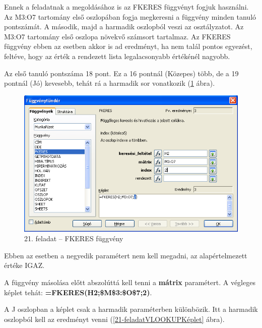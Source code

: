 Ennek a feladatnak a megoldásához is az FKERES függvényt fogjuk
használni. Az M3:O7 tartomány első oszlopában fogja
megkeresni a függvény minden tanuló pontszámát. A második,
majd a harmadik oszlopból veszi az osztályzatot. Az M3:O7
tartomány első oszlopa növekvő számsort tartalmaz. Az
FKERES függvény ebben az esetben akkor is ad eredményt, ha nem
talál pontos egyezést, feltéve, hogy az érték a rendezett
lista legalacsonyabb értékénél nagyobb.

Az első tanuló pontszáma 18 pont. Ez a 16 pontnál (Közepes)
több, de a 19 pontnál (Jó) kevesebb, tehát rá a harmadik sor
vonatkozik (\ref{21-feladatVLOOKUP} ábra).

\begin{figure}[!h]
\begin{center}
\includegraphics[width=13.999cm]{oocalcv2-img98.png}
\caption{21. feladat --  FKERES függvény}\label{21-feladatVLOOKUP}
\end{center}
\end{figure}

Ebben az esetben a negyedik paramétert nem kell megadni, az
alapértelmezett értéke IGAZ.

A függvény másolása előtt abszolúttá kell tenni a
\textbf{mátrix} paramétert. A végleges képlet tehát:
\textsf{\textbf{=FKERES(H2;\$M\$3:\$O\$7;2)}}.

A J oszlopban a képlet csak a harmadik paraméterben
különbözik. Itt a harmadik oszlopból kell az eredményt venni
(\ref{21-feladatVLOOKUPKéplet} ábra).

